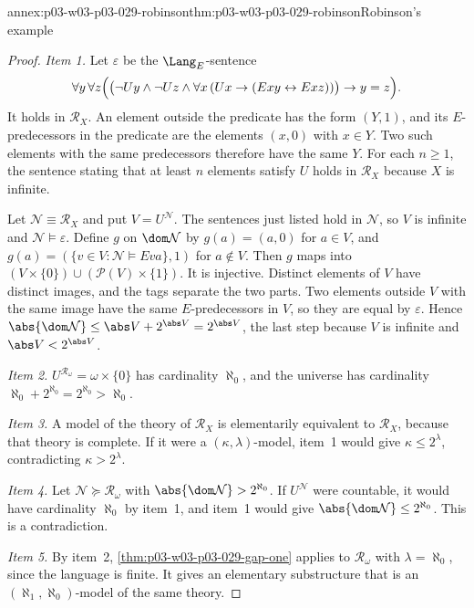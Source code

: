 \begin{annexitem}{annex:p03-w03-p03-029-robinson}{thm:p03-w03-p03-029-robinson}{Robinson's example}
\begin{proof}
\emph{Item 1.} Let \(\varepsilon\) be the \(\Lang_E\)-sentence
\[
  \forall y\,\forall z\Bigl(\bigl(\neg Uy\wedge\neg Uz\wedge
  \forall x\,(Ux\to(Exy\leftrightarrow Exz))\bigr)\to y=z\Bigr).
\]
It holds in \(\mathcal R_X\). An element outside the predicate has the form
\((Y,1)\), and its \(E\)-predecessors in the predicate are the elements
\((x,0)\) with \(x\in Y\). Two such elements with the same predecessors
therefore have the same \(Y\). For each \(n\geq1\), the sentence stating
that at least \(n\) elements satisfy \(U\) holds in \(\mathcal R_X\) because
\(X\) is infinite.

Let \(\mathcal N\equiv\mathcal R_X\) and put \(V=U^{\mathcal N}\). The
sentences just listed hold in \(\mathcal N\), so \(V\) is infinite and
\(\mathcal N\models\varepsilon\). Define \(g\) on \(\dom\mathcal N\) by
\(g(a)=(a,0)\) for \(a\in V\), and
\(g(a)=(\{v\in V:\mathcal N\models E v a\},1)\) for \(a\notin V\). Then
\(g\) maps into \((V\times\{0\})\cup(\mathcal P(V)\times\{1\})\). It is
injective. Distinct elements of \(V\) have distinct images, and the tags
separate the two parts. Two elements outside \(V\) with the same image have
the same \(E\)-predecessors in \(V\), so they are equal by \(\varepsilon\).
Hence \(\abs{\dom\mathcal N}\leq\abs V+2^{\abs V}=2^{\abs V}\), the last
step because \(V\) is infinite and \(\abs V<2^{\abs V}\).

\emph{Item 2.} \(U^{\mathcal R_\omega}=\omega\times\{0\}\) has cardinality
\(\aleph_0\), and the universe has cardinality
\(\aleph_0+2^{\aleph_0}=2^{\aleph_0}>\aleph_0\).

\emph{Item 3.} A model of the theory of \(\mathcal R_X\) is elementarily
equivalent to \(\mathcal R_X\), because that theory is complete. If it
were a \((\kappa,\lambda)\)-model, item~1 would give
\(\kappa\leq2^\lambda\), contradicting \(\kappa>2^\lambda\).

\emph{Item 4.} Let \(\mathcal N\succcurlyeq\mathcal R_\omega\) with
\(\abs{\dom\mathcal N}>2^{\aleph_0}\). If \(U^{\mathcal N}\) were
countable, it would have cardinality \(\aleph_0\) by item~1, and item~1
would give \(\abs{\dom\mathcal N}\leq2^{\aleph_0}\). This is a
contradiction.

\emph{Item 5.} By item~2, \cref{thm:p03-w03-p03-029-gap-one} applies to
\(\mathcal R_\omega\) with \(\lambda=\aleph_0\), since the language is
finite. It gives an elementary substructure that is an
\((\aleph_1,\aleph_0)\)-model of the same theory.
\end{proof}
\end{annexitem}

